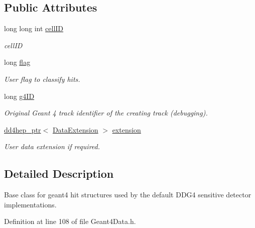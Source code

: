 \subsection*{Public Attributes}
\begin{DoxyCompactItemize}
\item 
long long int \hyperlink{class_d_d4hep_1_1_simulation_1_1_geant4_hit_data_a3ad003b720e4d7a1c6e66e0eabb58540}{cellID}
\begin{DoxyCompactList}\small\item\em cellID \item\end{DoxyCompactList}\item 
long \hyperlink{class_d_d4hep_1_1_simulation_1_1_geant4_hit_data_aee4dddb74fa4230f4a450f5eb96416af}{flag}
\begin{DoxyCompactList}\small\item\em User flag to classify hits. \item\end{DoxyCompactList}\item 
long \hyperlink{class_d_d4hep_1_1_simulation_1_1_geant4_hit_data_adaf354d937bc941aac70b2327aa1d1f3}{g4ID}
\begin{DoxyCompactList}\small\item\em Original Geant 4 track identifier of the creating track (debugging). \item\end{DoxyCompactList}\item 
\hyperlink{class_d_d4hep_1_1dd4hep__ptr}{dd4hep\_\-ptr}$<$ \hyperlink{class_d_d4hep_1_1_simulation_1_1_data_extension}{DataExtension} $>$ \hyperlink{class_d_d4hep_1_1_simulation_1_1_geant4_hit_data_a56ce0428b9799cf18cab288a77c6e3c5}{extension}
\begin{DoxyCompactList}\small\item\em User data extension if required. \item\end{DoxyCompactList}\end{DoxyCompactItemize}


\subsection{Detailed Description}
Base class for geant4 hit structures used by the default DDG4 sensitive detector implementations. 

Definition at line 108 of file Geant4Data.h.

